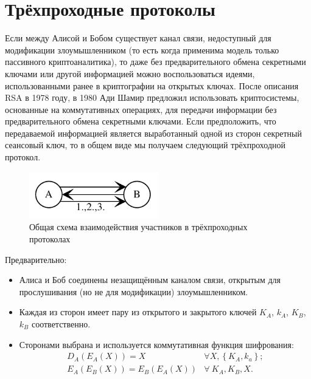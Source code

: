\section{Трёхпроходные протоколы}

Если между Алисой и Бобом существует канал связи, недоступный для модификации злоумышленником (то есть когда применима модель только пассивного криптоаналитика), то даже без предварительного обмена секретными ключами или другой информацией можно воспользоваться идеями, использованными ранее в криптографии на открытых ключах. После описания RSA в 1978 году, в 1980 Ади Шамир предложил использовать криптосистемы, основанные на коммутативных операциях, для передачи информации без предварительного обмена секретными ключами. Если предположить, что передаваемой информацией является выработанный одной из сторон секретный сеансовый ключ, то в общем виде мы получаем следующий трёхпроходной протокол.

\begin{figure}[!hb]
    \centering
    \includegraphics[width=0.5\textwidth]{pic/key_distribution-three-pass}
    \caption{Общая схема взаимодействия участников в трёхпроходных протоколах\label{fig:key_distribution-three-pass}}
\end{figure}

Предварительно:

\begin{itemize}
	\item Алиса и Боб соединены незащищённым каналом связи, открытым для прослушивания (но не для модификации) злоумышленником.
	\item Каждая из сторон имеет пару из открытого и закрытого ключей $K_A$, $k_A$, $K_B$, $k_B$ соответственно.
	\item Сторонами выбрана и используется коммутативная функция шифрования:
	\[\begin{array}{lll}
		D_{A} \left( E_{A} \left( X \right) \right)	= X                                       & \forall X, \left\{ K_A, k_a \right\}; \\
		E_{A} \left( E_{B} \left( X \right) \right)	= E_B \left( E_A \left( X \right) \right) & \forall ~ K_A, K_B, X.
	\end{array}\]
\end{itemize}

